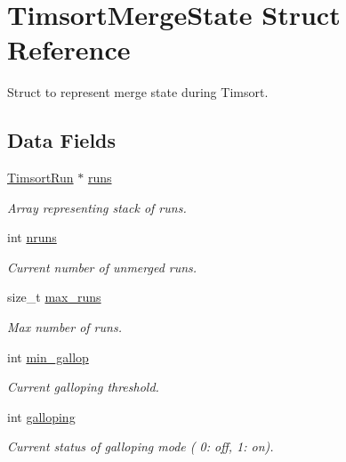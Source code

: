 \hypertarget{structTimsortMergeState}{}\section{Timsort\+Merge\+State Struct Reference}
\label{structTimsortMergeState}


Struct to represent merge state during Timsort.  


\subsection*{Data Fields}
\begin{DoxyCompactItemize}
\item 
\mbox{\label{structTimsortMergeState_a4eb61fa3007911eeeabe210681e05a16}} 
\hyperlink{structTimsortRun}{Timsort\+Run} $\ast$ \hyperlink{structTimsortMergeState_a4eb61fa3007911eeeabe210681e05a16}{runs}
\begin{DoxyCompactList}\small\item\em Array representing stack of runs. \end{DoxyCompactList}\item 
\mbox{\label{structTimsortMergeState_a8def51eaf93ba3835c693325cfc53c08}} 
int \hyperlink{structTimsortMergeState_a8def51eaf93ba3835c693325cfc53c08}{nruns}
\begin{DoxyCompactList}\small\item\em Current number of unmerged runs. \end{DoxyCompactList}\item 
\mbox{\label{structTimsortMergeState_a7a2c909e984e074738fec5870da174aa}} 
size\+\_\+t \hyperlink{structTimsortMergeState_a7a2c909e984e074738fec5870da174aa}{max\+\_\+runs}
\begin{DoxyCompactList}\small\item\em Max number of runs. \end{DoxyCompactList}\item 
\mbox{\label{structTimsortMergeState_a382c0762f06c680bb4fec455f8823bf1}} 
int \hyperlink{structTimsortMergeState_a382c0762f06c680bb4fec455f8823bf1}{min\+\_\+gallop}
\begin{DoxyCompactList}\small\item\em Current galloping threshold. \end{DoxyCompactList}\item 
\mbox{\label{structTimsortMergeState_ab45c7800608ba6dd2b3d7f7b68bafb68}} 
int \hyperlink{structTimsortMergeState_ab45c7800608ba6dd2b3d7f7b68bafb68}{galloping}
\begin{DoxyCompactList}\small\item\em Current status of galloping mode ( 0\+: off, 1\+: on). \end{DoxyCompactList}\end{DoxyCompactItemize}



